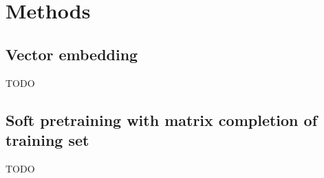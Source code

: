 \section*{Methods}
\subsection*{Vector embedding}
TODO

\subsection*{Soft pretraining with matrix completion of training set}
TODO


